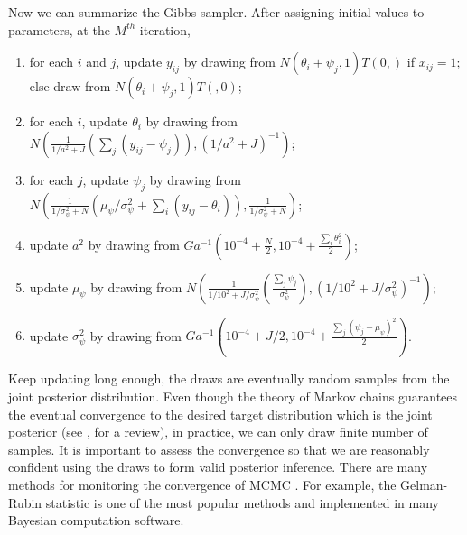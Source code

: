\documentclass[floatsintext, man]{apa7}
\begin{document}
Now we can summarize the Gibbs sampler. After assigning initial values to
parameters, at the $M^{th}$ iteration,
\begin{enumerate}
  \item for each $i$ and $j$, update $y_{ij}$ by drawing from $N(\theta_i +
  \psi_j, 1)T(0,)$ if $x_{ij} = 1$; else draw from $N(\theta_i + \psi_j, 1)T
  (,0)$;
  \item for each $i$, update $\theta_i$ by drawing from $N\left(\frac{1}{1/a^2 +
  J}(\sum_j (y_{ij} - \psi_j)), (1/a^2 + J)^{-1}\right)$;
  \item for each $j$, update $\psi_j$ by drawing from $N\left(\frac{1}
  {1/\sigma_\psi^2 + N}(\mu_\psi / \sigma_\psi^2 + \sum_i(y_{ij} -
  \theta_i)), \frac{1}{1/\sigma_\psi^2 + N}\right)$;
  \item update $a^2$ by drawing from $Ga^{-1}(10^{-4} + \frac{N}{2}, 10^{-4} +
  \frac{\sum_i \theta_i^2}{2})$;
  \item update $\mu_\psi$ by drawing from $N\left(\frac{1}{1/10^2 +
  J/\sigma_\psi^2}(\frac{\sum_j \psi_j}{\sigma_\psi^2}), (1 / 10^2 + J /
  \sigma_\psi^2)^{-1}\right)$;
  \item update $\sigma_\psi^2$ by drawing from $Ga^{-1}\left(10^{-4} + J
  / 2, 10^{-4} + \frac{\sum_j (\psi_j -\mu_\psi)^2}{2}\right)$.
\end{enumerate}
Keep updating long enough, the draws are eventually random samples from the
joint posterior distribution. Even though the theory of Markov chains guarantees
the eventual convergence to the desired target distribution which is the joint
posterior (see \cite{neal_probabilistic_1998}, for a review), in practice, we
can only draw finite number of samples. It is important to assess the
convergence so that we are reasonably confident using the draws to form valid
posterior inference. There are many methods for monitoring the convergence of
MCMC \parencite{cowles_markov_1996}. For example, the Gelman-Rubin statistic 
\parencite{gelman_inference_1992} is one of the most popular methods and
implemented in many Bayesian computation software.
\end{document}
